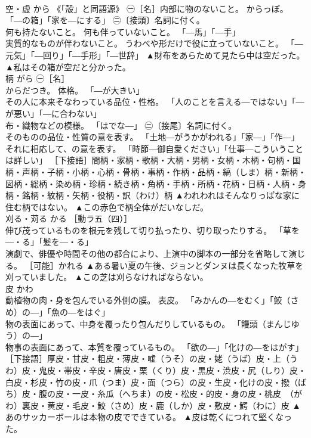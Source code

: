 \documentclass[8pt]{extreport}
\begin{document}
\begin{CJK}{UTF8}{min}
\\	空・虚	から	《「殻」と同語源》 ㊀［名］内部に物のないこと。 からっぽ。 「―の箱」「家を―にする」 ㊁〔接頭〕名詞に付く。 
\\	何も持たないこと。 何も伴っていないこと。 「―馬」「―手」 
\\	実質的なものが伴わないこと。 うわべや形だけで役に立っていないこと。 「―元気」「―回り」「―手形」「―世辞」	▲財布をあらためて見たら中は空だった。 ▲私はその箱が空だと分かった。
\\	柄	がら	㊀［名］ 
\\	からだつき。 体格。 「―が大きい」 
\\	その人に本来そなわっている品位・性格。 「人のことを言える―ではない」「―が悪い」「―に合わない」 
\\	布・織物などの模様。 「はでな―」 ㊁〔接尾〕名詞に付く。 
\\	そのものの品位・性質の意を表す。 「土地―がうかがわれる」「家―」「作―」 
\\	それに相応して、の意を表す。 「時節―御自愛ください」「仕事―こういうことは詳しい」 ［下接語］間柄・家柄・歌柄・大柄・男柄・女柄・木柄・句柄・国柄・声柄・子柄・小柄・心柄・骨柄・事柄・作柄・品柄・縞（しま）柄・新柄・図柄・総柄・染め柄・珍柄・続き柄・角柄・手柄・所柄・花柄・日柄・人柄・身柄・銘柄・紋柄・矢柄・役柄・訳（わけ）柄	▲われわれはそんなりっぱな家に住む柄ではない。 ▲この赤色で柄全体がだいなしだ。
\\	刈る・苅る	かる	［動ラ五（四）］ 
\\	伸び茂っているものを根元を残して切り払ったり、切り取ったりする。 「草を―・る」「髪を―・る」 
\\	演劇で、俳優や時間その他の都合により、上演中の脚本の一部分を省略して演じる。 ［可能］かれる	▲ある暑い夏の午後、ジョンとダンヌは長くなった牧草を刈っていました。 ▲この芝は刈らなければならない。
\\	皮	かわ	
\\	動植物の肉・身を包んでいる外側の膜。 表皮。 「みかんの―をむく」「鮫（さめ）の―」「魚の―をはぐ」 
\\	物の表面にあって、中身を覆ったり包んだりしているもの。 「饅頭（まんじゆう）の―」 
\\	物事の表面にあって、本質を覆っているもの。 「欲の―」「化けの―をはがす」 ［下接語］厚皮・甘皮・粗皮・薄皮・嘘（うそ）の皮・姥（うば）皮・上（うわ）皮・鬼皮・帯皮・辛皮・唐皮・栗（くり）皮・黒皮・渋皮・尻（しり）皮・白皮・杉皮・竹の皮・爪（つま）皮・面（つら）の皮・生皮・化けの皮・撥（ばち）皮・腹の皮・一皮・糸瓜（へちま）の皮・松皮・的皮・身の皮・桃皮　（がわ）裏皮・黄皮・毛皮・鮫（さめ）皮・鹿（しか）皮・敷皮・鰐（わに）皮	▲あのサッカーボールは本物の皮でできている。 ▲皮は乾くにつれて堅くなった。

\end{CJK}
\end{document}

